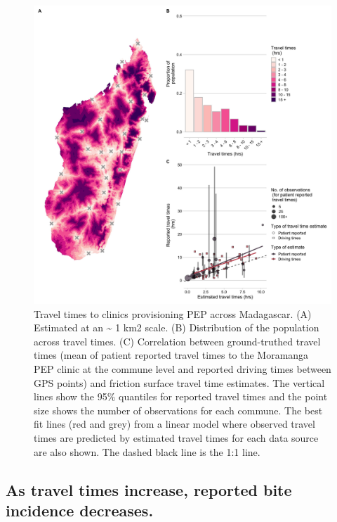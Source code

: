 \documentclass[
  oneside]{book}
\begin{document}
\begin{figure}
\includegraphics[width=0.9\linewidth]{figs/ch2/fig2} \caption[Travel times to clinics provisioning PEP across Madagascar.]{Travel times to clinics provisioning PEP across Madagascar. (A) Estimated at an \textasciitilde{} 1 km2 scale. (B) Distribution of the population
across travel times. (C) Correlation between ground-truthed travel times
(mean of patient reported travel times to the Moramanga PEP clinic at
the commune level and reported driving times between GPS points) and
friction surface travel time estimates. The vertical lines show the 95\%
quantiles for reported travel times and the point size shows the number
of observations for each commune. The best fit lines (red and grey) from
a linear model where observed travel times are predicted by estimated
travel times for each data source are also shown. The dashed black line
is the 1:1 line.}\label{fig:ch3-fig2}
\end{figure}












\hypertarget{as-travel-times-increase-reported-bite-incidence-decreases.}{%
\subsection{As travel times increase, reported bite incidence decreases.}\label{as-travel-times-increase-reported-bite-incidence-decreases.}}
\end{document}
